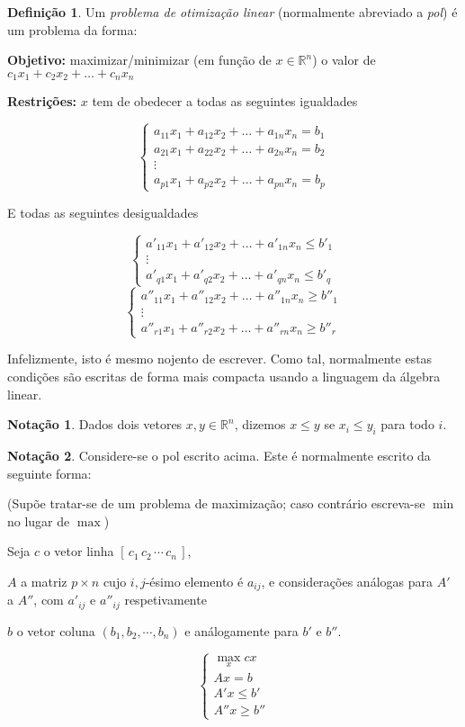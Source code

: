\documentclass{article}
\newcommand{\R}{\mathbb{R}}
\theoremstyle{definition}
\newtheorem{definition}{Definição}
\newtheorem*{notacao}{Notação}
\begin{document}
	\begin{definition}
	Um \emph{problema de otimização linear} (normalmente abreviado a \emph{pol}) é um problema da forma:
	
	\textbf{Objetivo: } maximizar/minimizar (em função de $x \in \R^n$) o valor de ${c_1 x_1 + c_2 x_2 + \ldots + c_n x_n}$
	
	\textbf{Restrições: } $x$ tem de obedecer a todas as seguintes igualdades

\[
\begin{cases}
	a_{11} x_1 + a_{12} x_2 + \ldots + a_{1n} x_n = b_1 \\ 
	a_{21} x_1 + a_{22} x_2 + \ldots + a_{2n} x_n = b_2 \\
	\vdots \\
	a_{p1} x_1 + a_{p2} x_2 + \ldots + a_{pn} x_n = b_p
\end{cases}
\]

E todas as seguintes desigualdades

\[
\begin{cases}
	a'_{11} x_1 + a'_{12} x_2 + \ldots + a'_{1n} x_n \leq b'_1 \\ 
	\vdots \\
	a'_{q1} x_1 + a'_{q2} x_2 + \ldots + a'_{qn} x_n \leq b'_q
\end{cases}
\]
\[
\begin{cases}
	a''_{11} x_1 + a''_{12} x_2 + \ldots + a''_{1n} x_n \geq b''_1 \\ 
	\vdots \\
	a''_{r1} x_1 + a''_{r2} x_2 + \ldots + a''_{rn} x_n \geq b''_r
\end{cases}
\]
	\end{definition}
	
	Infelizmente, isto é mesmo nojento de escrever. Como tal, normalmente estas condições são escritas de forma mais compacta usando a linguagem da álgebra linear.
	
	\begin{notacao}
Dados dois vetores $x,y \in \R^n$, dizemos $x \leq y$ se $x_i \leq y_i$ para todo $i$.
	\end{notacao}
	\begin{notacao}
	Considere-se o pol escrito acima. Este é normalmente escrito da seguinte forma:
	
	(Supõe tratar-se de um problema de maximização; caso contrário escreva-se $\min$ no lugar de $\max$)
	
	Seja $c$ o vetor linha $[\,c_1\,c_2\, \cdots \,c_n\,]$,

	$A$ a matriz $p \times n$ cujo $i,j$-ésimo elemento é $a_{ij}$, e considerações análogas para $A'$ a $A''$, com $a'_{ij}$ e $a''_{ij}$ respetivamente
	
	$b$ o vetor coluna $(b_1, b_2, \cdots, b_n)$ e análogamente para $b'$ e $b''$.
	
	\[
	\begin{cases}
	\max\limits_x cx \\
	Ax = b \\
	A'x \leq b' \\
	A''x \geq b''
	\end{cases}
	\]
	\end{notacao}
	
\end{document}
